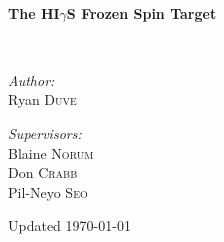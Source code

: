 \begin{titlepage}
\begin{center}
\HRule \\[0.4cm]
{ \huge \bfseries The HI$\gamma$S Frozen Spin Target \\[0.4cm] }

\HRule \\[1.5cm]

\begin{minipage}{0.4\textwidth}
\begin{flushleft} \large
\emph{Author:}\\
Ryan \textsc{Duve}
\end{flushleft}
\end{minipage}
\begin{minipage}{0.4\textwidth}
\begin{flushright} \large
\emph{Supervisors:} \\
Blaine \textsc{Norum} \\
Don \textsc{Crabb} \\
Pil-Neyo \textsc{Seo}
\end{flushright}
\end{minipage}

\vfill

{\large Updated \today}

\end{center}
\end{titlepage}